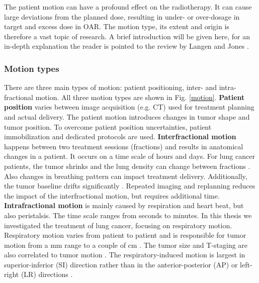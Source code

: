 The patient motion can have a profound effect on the radiotherapy. It can cause large deviations from the planned dose, resulting in under- or over-dosage in target and excess dose in OAR. The motion type, its extent and origin is therefore a vast topic of research. 
A brief introduction will be given here, for an in-depth explanation the reader is pointed to the review by Langen and Jones \cite{Langen2001}.


\subsubsection{Motion types}

There are three main types of motion: patient positioning, inter- and intra-fractional motion. All three motion types are shown in Fig. \ref{motion}.
\newline
\textbf{Patient position} varies between image acquisition (e.g. CT) used for treatment planning and actual delivery. The patient motion introduces changes in tumor shape and tumor position. To overcome patient 
position uncertainties, patient immobilization and dedicated protocols are used.
\newline
\textbf{Interfractional motion} happens between two treatment sessions (fractions) and results in anatomical changes in a patient. It occurs on a time scale of hours and days. For lung cancer patients, the 
tumor shrinks and the lung density can change between fractions \cite{Mori2009}. 
Also changes in breathing pattern can impact treatment delivery. Additionally, the tumor baseline drifts significantly \cite{Sonke2008}. Repeated imaging and replanning reduces the impact of the interfractional motion, but requires additional time.
\newline
\textbf{Intrafractional motion} is mainly caused by respiration and heart beat, but also peristalsis. The time scale ranges from seconds to minutes. In this thesis we investigated the treatment of lung cancer, focusing on respiratory motion. Respiratory motion varies from patient to patient and 
is responsible for tumor motion from a mm range to a couple of cm \cite{Shirato2004a}. The tumor size and T-staging are also correlated to tumor motion \cite{Liu2007}. The respiratory-induced motion is largest in superior-inferior (SI) direction rather than 
in the anterior-posterior (AP) or left-right (LR) directions \cite{Seppenwoolde2002, Britton2007, Liu2007}.

\newpage

